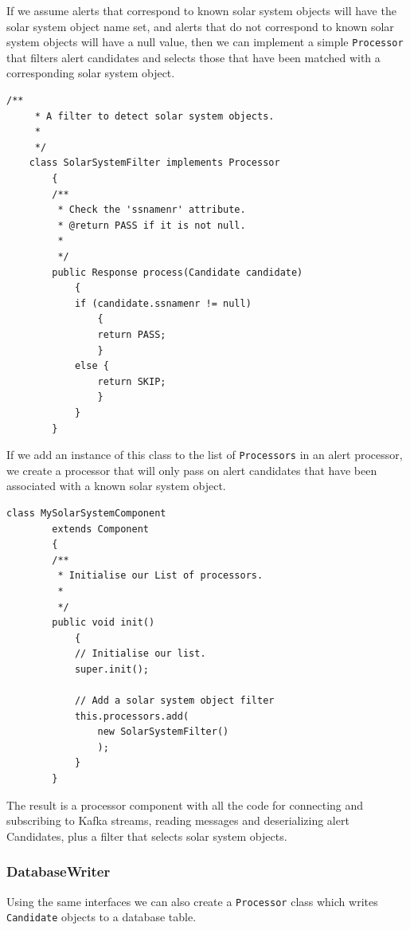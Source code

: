 \documentclass{article}
\newcommand{\kafka} {Kafka\xspace}
\begin{document}
If we assume alerts that correspond to known solar system objects will have the solar system object name set, and alerts that do not correspond to known solar system objects will have a null value, then we can implement a simple \texttt{Processor} that filters alert candidates and selects those that have been matched with a corresponding solar system object.

\begin{lstlisting}[style=Java]
    /**
     * A filter to detect solar system objects.
     *
     */
    class SolarSystemFilter implements Processor
        {
        /**
         * Check the 'ssnamenr' attribute.
         * @return PASS if it is not null.
         *
         */
        public Response process(Candidate candidate)
            {
            if (candidate.ssnamenr != null)
                {
                return PASS;
                }
            else {
                return SKIP;
                }
            }
        }
\end{lstlisting}

If we add an instance of this class to the list of \texttt{Processors} in an alert processor, we create a processor that will only pass on alert candidates that have been associated with a known solar system object.

\begin{lstlisting}[style=Java]
    class MySolarSystemComponent
        extends Component
        {
        /**
         * Initialise our List of processors.
         *
         */
        public void init()
            {
            // Initialise our list.
            super.init();

            // Add a solar system object filter
            this.processors.add(
                new SolarSystemFilter()
                );
            }
        }
\end{lstlisting}

The result is a processor component with all the code for connecting and subscribing to \kafka streams, reading messages and deserializing alert Candidates, plus a filter that selects solar system objects.

\subsubsection{DatabaseWriter}
\label{java-interfaces.DatabaseWriter}

Using the same interfaces we can also create a \texttt{Processor} class which writes \texttt{Candidate} objects to a database table.
\end{document}
